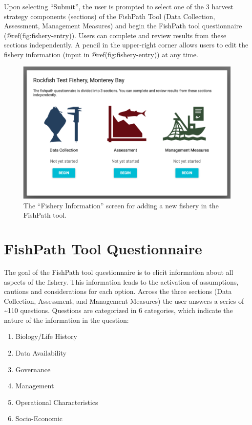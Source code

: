 \documentclass[11pt,]{book}
\providecommand{\tightlist}{%
  \setlength{\itemsep}{0pt}\setlength{\parskip}{0pt}}
\begin{document}
Upon selecting ``Submit'', the user is prompted to select one of the 3
harvest strategy components (sections) of the FishPath Tool (Data
Collection, Assessment, Management Measures) and begin the FishPath tool
questionnaire (@ref(fig:fishery-entry)). Users can complete and review
results from these sections independently. A pencil in the upper-right
corner allows users to edit the fishery information (input in
@ref(fig:fishery-entry)) at any time.

\begin{figure}

{\centering \includegraphics[width=0.95\linewidth]{images/fishery-entry-screen} 

}

\caption{The “Fishery Information” screen for adding a new fishery in the FishPath tool.}\label{fig:fishery-entry}
\end{figure}

\hypertarget{fishpath-tool-questionnaire}{%
\chapter{FishPath Tool
Questionnaire}\label{fishpath-tool-questionnaire}}

The goal of the FishPath tool questionnaire is to elicit information
about all aspects of the fishery. This information leads to the
activation of assumptions, cautions and considerations for each option.
Across the three sections (Data Collection, Assessment, and Management
Measures) the user answers a series of \textasciitilde110 questions.
Questions are categorized in 6 categories, which indicate the nature of
the information in the question:

\begin{enumerate}
\def\labelenumi{\arabic{enumi}.}
\tightlist
\item
  Biology/Life History
\item
  Data Availability
\item
  Governance
\item
  Management
\item
  Operational Characteristics
\item
  Socio-Economic
\end{enumerate}
\end{document}
